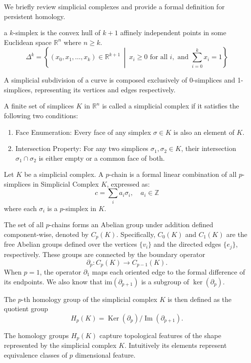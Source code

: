 \documentclass{ws-mplb}
\begin{document}
We briefly review simplicial complexes and provide a formal definition for persistent homology.

\begin{definition}[k-simplex]



a \( k \)-simplex is the convex hull of  \( k+1 \) affinely independent points in some Euclidean space \( \mathbb{R}^n \) where \( n \ge k \).
\[
\Delta^k = \left\{(x_0, x_1, \dots, x_k) \in \mathbb{R}^{k+1} \ \middle| \ x_i \ge 0 \text{ for all } i, \text{ and } \sum_{i=0}^k x_i = 1\right\}
\]
\end{definition}
A simplicial subdivision of a curve is composed exclusively of 0-simplices and 1-simplices, representing its vertices and edges respectively.

\begin{definition}
A finite set of simplices $K$ in $\mathbb{R}^n$ is called a simplicial complex if it satisfies the following two conditions:
\begin{enumerate}
    \item {Face Enumeration:} Every face of any simplex $\sigma \in K$ is also an element of $K$.
    \item {Intersection Property:} For any two simplices $\sigma_1, \sigma_2 \in K$, their intersection $\sigma_1 \cap \sigma_2$ is either empty or a common face of both.
\end{enumerate}
\end{definition}

\begin{definition}[$p$-chain]
Let $K$ be a simplicial complex. A $p$-chain is a formal linear combination of all $p$-simplices in Simplicial Complex $K$, expressed as:$$c = \sum_{i} a_i \sigma_i, \quad a_i \in \mathbb{Z}$$where each $\sigma_i$ is a $p$-simplex in $K$.
\end{definition}

The set of all $p$-chains forms an Abelian group under addition defined component-wise,  denoted by $C_p(K)$.
Specifically, $C_0(K)$ and $C_1(K)$ are the free Abelian groups defined over the vertices $\{v_i\}$ and the directed edges $\{e_j\}$, respectively. These groups are connected by the boundary operator
$$\partial_p: C_p(K) \to C_{p-1}(K).$$
When $p=1$, the operator $\partial_1$ maps each oriented edge to the formal difference of its endpoints.
We also know that $\text{im}(\partial_{p+1}) $ is a subgroup of $\ker(\partial_p)$.
\begin{definition}
The $p$-th homology group of the simplicial complex $K$ is then defined as the quotient group
$$
H_p(K)=\operatorname{Ker}\left(\partial_p\right) / \operatorname{Im}\left(\partial_{p+1}\right) .
$$
\end{definition}
The homology groups $H_p(K)$ capture topological features of the shape represented by the simplicial complex $K$. Intuitively its elements represent equivalence classes of $p$ dimensional feature.
\end{document}
